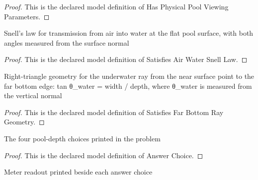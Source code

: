 \begin{proof}
  This is the declared model definition of Has Physical Pool Viewing Parameters.
\end{proof}
\begin{definition}
  \label{def:physics:phyx-mini-0145:phyxminiproblems-problemphyxmini0145-satisfiesairwatersnelllaw}
  Snell's law for transmission from air into water at the flat pool surface, with both angles measured from the surface normal
\end{definition}
\begin{proof}
  This is the declared model definition of Satisfies Air Water Snell Law.
\end{proof}
\begin{definition}
  \label{def:physics:phyx-mini-0145:phyxminiproblems-problemphyxmini0145-satisfiesfarbottomraygeometry}
  Right-triangle geometry for the underwater ray from the near surface point to the far bottom edge: tan θ\_water = width / depth, where θ\_water is measured from the vertical normal
\end{definition}
\begin{proof}
  This is the declared model definition of Satisfies Far Bottom Ray Geometry.
\end{proof}
\begin{definition}
  \label{def:physics:phyx-mini-0145:phyxminiproblems-problemphyxmini0145-answerchoice}
  The four pool-depth choices printed in the problem
\end{definition}
\begin{proof}
  This is the declared model definition of Answer Choice.
\end{proof}
\begin{definition}
  \label{def:physics:phyx-mini-0145:phyxminiproblems-problemphyxmini0145-answerdepthmeters}
  Meter readout printed beside each answer choice
\end{definition}
